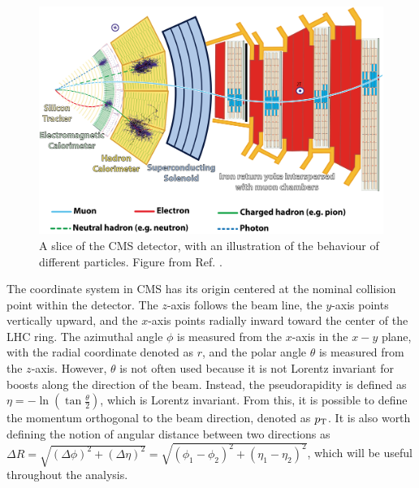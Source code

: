 \begin{figure}[!ht]
    \vspace*{-0.0cm}
    \centering
    \setlength{\mylength}{\textwidth}
    \includegraphics[width=0.85\mylength]{resources/CMS_slice.png}
    \vspace*{-0.0cm}
    \caption{A slice of the CMS detector, with an illustration of the behaviour of different particles. Figure from Ref. \cite{Barney:2120661}.}
    \label{fig:CMS_slice}
    \vspace*{-0.3cm}
\end{figure}

The coordinate system in CMS has its origin centered at the nominal collision point within the detector. The $z$-axis follows the beam line, the $y$-axis points vertically upward, and the $x$-axis points radially inward toward the center of the LHC ring. The azimuthal angle $\phi$ is measured from the $x$-axis in the $x-y$ plane, with the radial coordinate denoted as $r$, and the polar angle $\theta$ is measured from the $z$-axis. However, $\theta$ is not often used because it is not Lorentz invariant for boosts along the direction of the beam. Instead, the pseudorapidity is defined as $\eta = -\ln{\left(\tan{\frac{\theta}{2}}\right)}$, which is Lorentz invariant. From this, it is possible to define the momentum orthogonal to the beam direction, denoted as $p_\text{T}$. It is also worth defining the notion of angular distance between two directions as $\Delta R = \sqrt{\left(\Delta\phi\right)^2 + \left(\Delta\eta\right)^2} = \sqrt{\left(\phi_1-\phi_2\right)^2 + \left(\eta_1-\eta_2\right)^2}$, which will be useful throughout the analysis.

